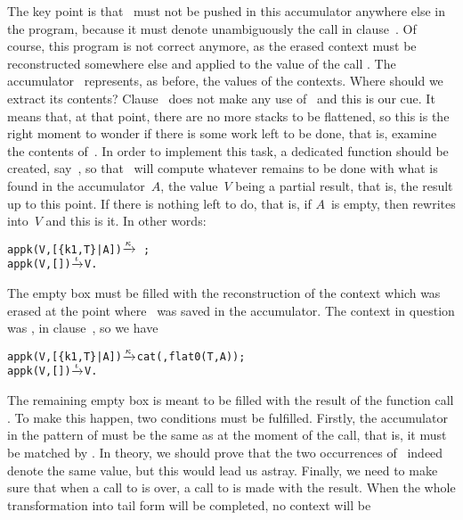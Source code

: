 The key point is that ~must not be pushed in this
accumulator anywhere else in the program, because it must denote
unambiguously the call in clause~\clause{\epsilon}. Of course, this
program is not correct anymore, as the erased context must be
reconstructed somewhere else and applied to the value of the call
. The accumulator~
represents, as before, the values of the contexts. Where should we
extract its contents? Clause~\clause{\gamma} does not make any use
of~ and this is our cue. It means that, at that point,
there are no more stacks to be flattened, so this is the right moment
to wonder if there is some work left to be done, that is, examine the
contents of~. In order to implement this task, a dedicated
function should be created, say~, so
that~ will compute whatever remains to be
done with what is found in the accumulator~\(A\), the value~\(V\)
being a partial result, that is, the result up to this point. If there
is nothing left to do, that is, if \(A\)~is empty, then
 rewrites into~\(V\) and this is it. In
other words:
\begin{alltt}
appk(V,[\{k1,T\}|A]) \(\smashedrightarrow{\kappa}\) \,;
appk(V,        []) \(\smashedrightarrow{\iota}\) V.\hfill% \emph{The end}
\end{alltt}
The empty box must be filled with the reconstruction of the context
which was erased at the point where~ was saved in the
accumulator. The context in question was
, in
clause~\clause{\epsilon}, so we have
\begin{alltt}
appk(V,[\{k1,T\}|A]) \(\smashedrightarrow{\kappa}\) cat(,flat0(T,A));
appk(V,        []) \(\smashedrightarrow{\iota}\) V.
\end{alltt}
The remaining empty box is meant to be filled with the result of the
function call . To make this happen,
two conditions must be fulfilled. Firstly, the accumulator in the
pattern of  must be the same as at the moment of the
call, that is, it must be matched by \erlcode{[\{k1,T\}|A]}. In
theory, we should prove that the two occurrences of~ indeed
denote the same value, but this would lead us astray. Finally, we need
to make sure that when a call to  is over, a call to
 is made with the result. When the whole
transformation into tail form will be completed, no context will be
